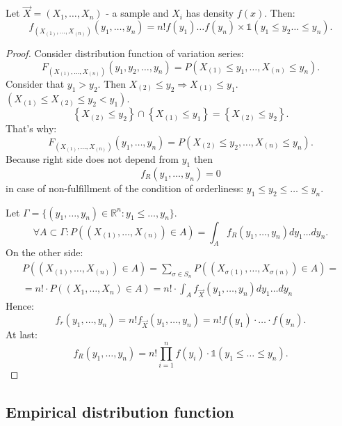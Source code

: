 \begin{proposition}
    Let \( \vec{X} = \left( X_1, \ldots, X_n \right) \) - a sample and $X_i$ has density 
    $f(x)$. Then:
    \[
    f_{( X_{(1)}, \ldots, X_{(n)})} (y_1, \ldots, y_n) = n! f(y_1) \ldots f(y_n) \times
    \mathds{1}(y_1 \leq y_2 \ldots \leq y_n)
    .\] 
\end{proposition}
\begin{proof}
    Consider distribution function of variation series:
\[
    F_{(X_{(1)}, \ldots, X_{(n)})} (y_1, y_2, \ldots, y_n) =
    P\left( X_{(1)} \leq y_1, \ldots, X_{(n)} \leq y_n \right).
\] 
Consider that $y_1 > y_2$. Then $X_{(2)} \leq y_2 \Rightarrow X_{(1)} \leq y_1$.
$\left( X_{(1)} \leq X_{(2)} \leq y_2 < y_1 \right) $.
\[
    \left\{ X_{(2)} \leq y_2 \right\} \cap \left\{ X_{(1)} \leq y_1 \right\} = \left\{ X_{(2)} \leq y_2 \right\} 
.\] 
That's why:
\[
F_{\left( X_{(1)}, \ldots, X_{(n)} \right) } (y_1, \ldots, y_n) = 
P\left( X_{(2)} \leq y_2, \ldots, X_{(n)} \leq y_n \right) 
.\] 
Because right side does not depend from $y_1$ then 
\[
f_R (y_1, \ldots, y_n) = 0
\] 
in case of non-fulfillment of the condition of orderliness: $y_1 \leq y_2 \leq \ldots \leq y_n$.

Let $\Gamma = \{\left( y_1, \ldots, y_n \right) \in \mathbb{R}^n : y_1 \leq \ldots, y_n\}$.
\[
\forall A \subset \Gamma : P\left(  \left( X_{(1)}, \ldots, X_{(n)} \right) \in A \right) =
\int_{A}^{} f_R (y_1, \ldots, y_n) dy_1 \ldots dy_n 
.\] 
On the other side:
\[
\] 
\begin{gather*}
P\left( \left( X_{(1)}, \ldots, X_{(n)} \right) \in A \right) =
\sum_{\sigma \in S_n}^{} P\left( \left( X_{\sigma(1)}, \ldots, X_{\sigma(n)} \right) \in A \right) = \\
= n! \cdot P\left( \left( X_1, \ldots, X_n \right) \in A \right)
= n! \cdot \int_{A}^{} f_{\vec{X}} \left( y_1, \ldots, y_n \right)  dy_1\ldots dy_n 
\end{gather*}
Hence:
\[
f_r(y_1, \ldots, y_n) = n! f_{\vec{X}} (y_1, \ldots, y_n) = n! f(y_1) \cdot \ldots \cdot f(y_n)
.\] 
At last:
\[
f_R (y_1, \ldots, y_n) = n! \prod_{i=1}^{n} f(y_i) \cdot \mathds{1}(y_1 \leq \ldots \leq y_n) 
.\] 
\end{proof}



\subsection{Empirical distribution function}

